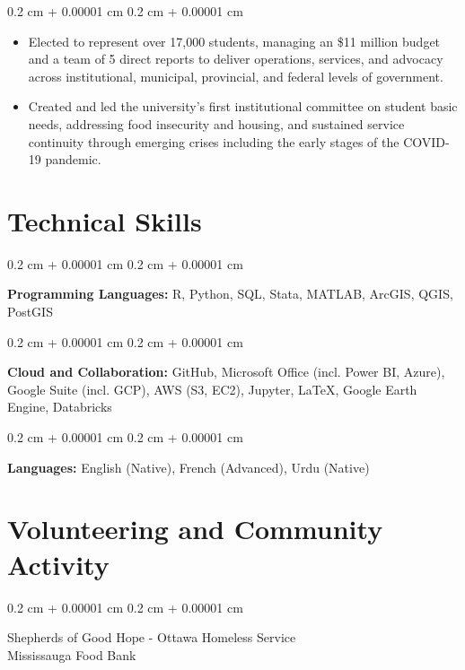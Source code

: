 \documentclass[10pt, a4paper]{article}
\newenvironment{highlights}{
    \begin{itemize}[
        topsep=0.10 cm,
        parsep=0.10 cm,
        partopsep=0pt,
        itemsep=0pt,
        leftmargin=0.4 cm + 10pt
    ]
}{
    \end{itemize}
} %
\newenvironment{onecolentry}{
    \begin{adjustwidth}{
        0.2 cm + 0.00001 cm
    }{
        0.2 cm + 0.00001 cm
    }
}{
    \end{adjustwidth}
} %
\begin{document}
        \vspace{0.10 cm}
        \begin{onecolentry}
            \begin{highlights}
                \item Elected to represent over 17,000 students, managing an \$11 million budget and a team of 5 direct reports to deliver operations, services, and advocacy across institutional, municipal, provincial, and federal levels of government.
                \item Created and led the university's first institutional committee on student basic needs, addressing food insecurity and housing, and sustained service continuity through emerging crises including the early stages of the COVID-19 pandemic.
            \end{highlights}
        \end{onecolentry}

    
    \section{Technical Skills}

        \begin{onecolentry}
            \textbf{Programming Languages:} R, Python, SQL, Stata, MATLAB, ArcGIS, QGIS, PostGIS
        \end{onecolentry}
\vspace{0.1cm}
        \begin{onecolentry}
            \textbf{Cloud and Collaboration:} GitHub, Microsoft Office (incl. Power BI, Azure), Google Suite (incl. GCP), AWS (S3, EC2), Jupyter, \LaTeX, Google Earth Engine, Databricks
        \end{onecolentry}
\vspace{0.1cm}
        \begin{onecolentry}
            \textbf{Languages:} English (Native), French (Advanced), Urdu (Native)
        \end{onecolentry}

\section{Volunteering and Community Activity}
        \begin{onecolentry}
        Shepherds of Good Hope - Ottawa Homeless Service \\
            Mississauga Food Bank 
        \end{onecolentry}
        
\end{document}
